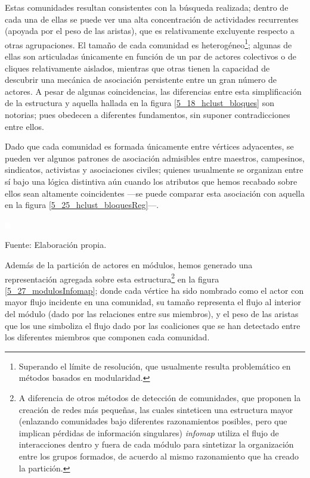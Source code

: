 \documentclass[letterpaper, 11pt]{book}
\theoremstyle{definition}
\theoremstyle{remark}
\begin{document}
Estas comunidades resultan consistentes con la búsqueda realizada; dentro de cada una de ellas se puede ver una alta concentración de actividades recurrentes (apoyada por el peso de las aristas), que es relativamente excluyente respecto a otras agrupaciones. 
El tamaño de cada comunidad es heterogéneo\footnote{
    Superando el límite de resolución, que usualmente resulta problemático en métodos basados en modularidad. 
}; algunas de ellas son articuladas únicamente en función de un par de actores colectivos o de cliques relativamente aislados, mientras que otras tienen la capacidad de descubrir una mecánica de asociación persistente entre un gran número de actores. 
A pesar de algunas coincidencias, las diferencias entre esta simplificación de la estructura y aquella hallada en la figura \ref{5_18_hclust_bloques} son notorias; pues obedecen a diferentes fundamentos, sin suponer contradicciones entre ellos. 


Dado que cada comunidad es formada únicamente entre vértices adyacentes, se pueden ver algunos patrones de asociación admisibles entre maestros, campesinos, sindicatos, activistas y asociaciones civiles; quienes usualmente se organizan entre sí bajo una lógica distintiva aún cuando los atributos que hemos recabado sobre ellos sean altamente coincidentes ---se puede comparar esta asociación con aquella en la figura \ref{5_25_hclust_bloquesReg}---. 

\begin{minipage}{\linewidth}
\centering
{} \label{5_27_modulosInfomap}

\includegraphics[scale=0.1]{img/null.png}
\vspace{28em}
\par\bigskip
\small Fuente: Elaboración propia.
\end{minipage}\bigskip


Además de la partición de actores en módulos, hemos generado una representación agregada sobre esta estructura\footnote{
    A diferencia de otros métodos de detección de comunidades, que proponen la creación de redes más pequeñas, las cuales sinteticen una estructura mayor (enlazando comunidades bajo diferentes razonamientos posibles, pero que implican pérdidas de información singulares) \emph{infomap} utiliza el flujo de interacciones dentro y fuera de cada módulo para sintetizar la organización entre los grupos formados, de acuerdo al mismo razonamiento que ha creado la partición. 
} en la figura \ref{5_27_modulosInfomap}; donde cada vértice ha sido nombrado como el actor con mayor flujo incidente en una comunidad, su tamaño representa el flujo al interior del módulo (dado por las relaciones entre sus miembros), y el peso de las aristas que los une simboliza el flujo dado por las coaliciones que se han detectado entre los diferentes miembros que componen cada comunidad. 
\end{document}
